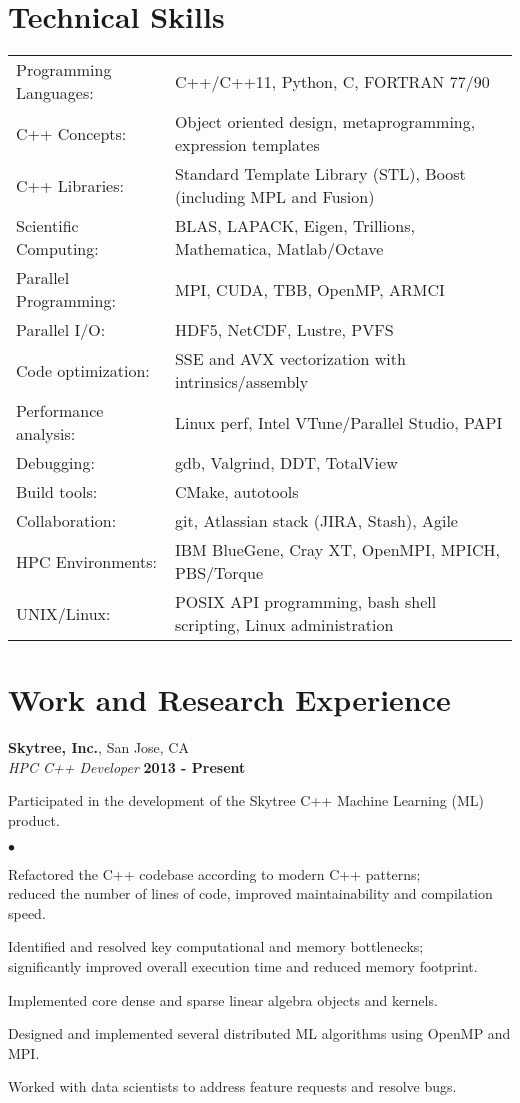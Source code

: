 \documentclass[overlap,line]{cv}
\newenvironment{list2}{
  \begin{list}{$\bullet$}{%
      \setlength{\itemsep}{0in}
      \setlength{\parsep}{0in} \setlength{\parskip}{0in}
      \setlength{\topsep}{0in} \setlength{\partopsep}{0in} 
      \setlength{\leftmargin}{0.2in}}}{\end{list}}
\begin{document}
\begin{resume}
\section{\sc Technical Skills}
\vspace{.05in}
\begin{tabular}{ l @{\hskip 1em} l }
Programming Languages: & C++/C++11, Python, C, FORTRAN 77/90 \\
C++ Concepts: & Object oriented design, metaprogramming, expression templates \\
C++ Libraries: & Standard Template Library (STL), Boost (including MPL and Fusion)\\
Scientific Computing: & BLAS, LAPACK, Eigen, Trillions, Mathematica, Matlab/Octave \\
Parallel Programming: & MPI, CUDA, TBB, OpenMP, ARMCI \\
Parallel I/O: & HDF5, NetCDF, Lustre, PVFS \\
Code optimization: & SSE and AVX vectorization with intrinsics/assembly \\
Performance analysis: & Linux perf, Intel VTune/Parallel Studio, PAPI \\
Debugging: & gdb, Valgrind, DDT, TotalView \\
Build tools: & CMake, autotools \\
Collaboration: & git, Atlassian stack (JIRA, Stash), Agile \\
HPC Environments: & IBM BlueGene, Cray XT, OpenMPI, MPICH, PBS/Torque \\
UNIX/Linux: & POSIX API programming, bash shell scripting, Linux administration \\
\end{tabular}


\section{\sc Work and Research Experience}
\vspace{.05in}
{\bf Skytree, Inc.}, San Jose, CA \\
{\it HPC C++ Developer} \hfill {\bf 2013 - Present}

Participated in the development of the Skytree C++ Machine Learning (ML) product.
\vspace{.05in}
\begin{list2}
\item Refactored the C++ codebase according to modern C++ patterns; \\
  reduced the number of lines of code, improved maintainability and compilation speed.
\item Identified and resolved key computational and memory bottlenecks; \\
  significantly improved overall execution time and reduced memory footprint.
\item Implemented core dense and sparse linear algebra objects and kernels.
\item Designed and implemented several distributed ML algorithms using OpenMP and MPI.
\item Worked with data scientists to address feature requests and resolve bugs.
\end{list2}


\end{resume}
\end{document}
